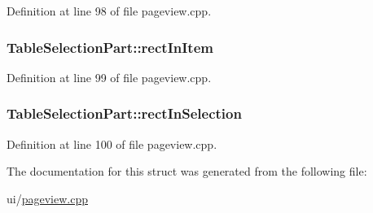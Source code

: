 Definition at line 98 of file pageview.\+cpp.

\hypertarget{structTableSelectionPart_ade01925b1444763cb413ad51ae7729a7}{
\subsubsection[{rect\+In\+Item}]{ Table\+Selection\+Part\+::rect\+In\+Item}}\label{structTableSelectionPart_ade01925b1444763cb413ad51ae7729a7}


Definition at line 99 of file pageview.\+cpp.

\hypertarget{structTableSelectionPart_a237572cb28552e59818071208c21ee43}{
\subsubsection[{rect\+In\+Selection}]{ Table\+Selection\+Part\+::rect\+In\+Selection}}\label{structTableSelectionPart_a237572cb28552e59818071208c21ee43}


Definition at line 100 of file pageview.\+cpp.



The documentation for this struct was generated from the following file\+:\begin{DoxyCompactItemize}
\item 
ui/\hyperlink{pageview_8cpp}{pageview.\+cpp}\end{DoxyCompactItemize}
